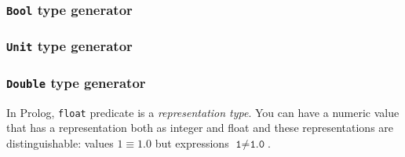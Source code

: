\documentclass{report}
\theoremstyle{definition}
\theoremstyle{definition}
\newcommand{\ttt}[1]{\texttt{#1}}
\begin{document}
\subsubsection{\ttt{Bool} type generator}

\subsubsection{\ttt{Unit} type generator}

\subsubsection{\ttt{Double} type generator}
In Prolog, \ttt{float} predicate is a \textit{representation type}. You can have a numeric value that has a representation both as integer and float and these representations are distinguishable: values $1 \equiv 1.0$ but expressions $\ttt{1} \neq \ttt{1.0}$.

\end{document}
